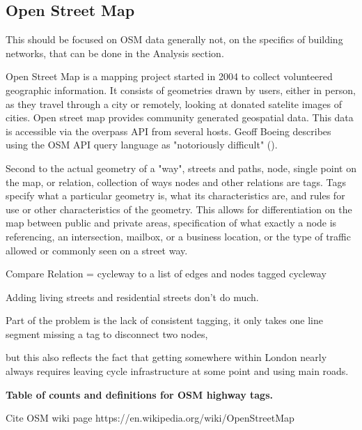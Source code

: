 
\subsection{Open Street Map}

This should be focused on OSM data generally not, on the specifics of building networks, that can be done in the Analysis section. 


Open Street Map is a mapping project started in 2004 to collect volunteered geographic information. It consists of geometries drawn by users, either in person, as they travel through a city or remotely, looking at donated satelite images of cities. Open street map provides community generated geospatial data. This data is accessible via the overpass API from several hosts. Geoff Boeing describes using the OSM API query language as "notoriously difficult" (\cite{osmnx}). 


Second to the actual geometry of a "way", streets and paths, node, single point on the map, or relation, collection of ways nodes and other relations are tags. Tags specify what a particular geometry is, what its characteristics are, and rules for use or other characteristics of the geometry. This allows for differentiation on the map between public and private areas, specification of what exactly a node is referencing, an intersection, mailbox, or a business location, or the type of traffic allowed or commonly seen on a street way. 
 

Compare Relation = cycleway to a list of edges and nodes tagged cycleway

Adding living streets and residential streets don't do much. 

Part of the problem is the lack of consistent tagging, it only takes one line segment missing a tag to disconnect two nodes,

but this also reflects the fact that getting somewhere within London nearly always requires leaving cycle infrastructure at some point and using main roads. 

\textbf{Table of counts and definitions for OSM highway tags. } 

Cite OSM wiki page
https://en.wikipedia.org/wiki/OpenStreetMap






